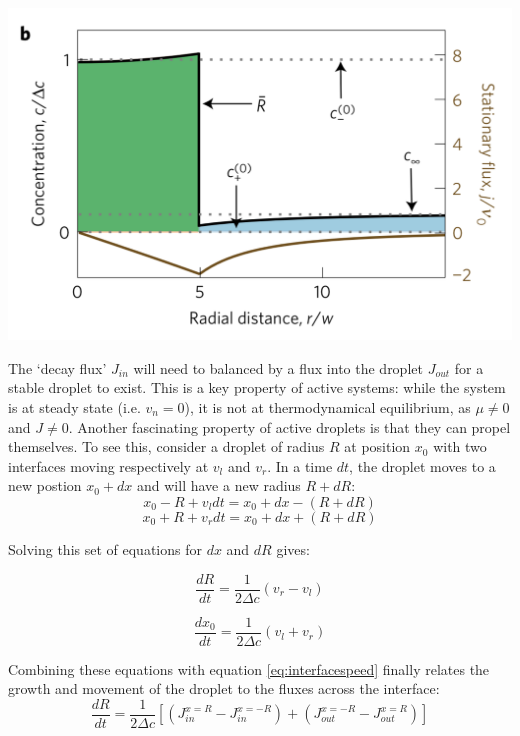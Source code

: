 \documentclass{Dissertate}
\let\origfigure\figure
\let\endorigfigure\endfigure
\renewenvironment{figure}[1][2] {
    \expandafter\origfigure\expandafter[H]
} {
    \endorigfigure
}
\begin{document}
\begin{figure}
\hypertarget{fig:activedroplet}{%
\centering
\includegraphics{source/figures/png/activedroplet.png}
\caption{Typical concentration profile of active droplet. Taken from
21}\label{fig:activedroplet}
}
\end{figure}

The `decay flux' \(J_{in}\) will need to balanced by a flux into the
droplet \(J_{out}\) for a stable droplet to exist. This is a key
property of active systems: while the system is at steady state (i.e.
\(v_n=0\)), it is not at thermodynamical equilibrium, as \(\mu \neq 0\)
and \(J\neq0\). Another fascinating property of active droplets is that
they can propel themselves. To see this, consider a droplet of radius
\(R\) at position \(x_0\) with two interfaces moving respectively at
\(v_l\) and \(v_r\). In a time \(dt\), the droplet moves to a new
postion \(x_0+dx\) and will have a new radius \(R+dR\): \[
x_0-R+v_ldt=x_0+dx-(R+dR)
\] \[
x_0+R+v_rdt=x_0+dx+(R+dR)
\]

Solving this set of equations for \(dx\) and \(dR\) gives:

\begin{equation}
\frac{dR}{dt}=\frac{1}{2\Delta c}(v_r-v_l)
\label{eq:radius}\end{equation}

\begin{equation}
\frac{dx_0}{dt}=\frac{1}{2\Delta c}(v_l+v_r)
\label{eq:position}\end{equation}

Combining these equations with equation \ref{eq:interfacespeed}
finally relates the growth and movement of the droplet to the fluxes
across the interface: \[
\frac{dR}{dt}=\frac{1}{2\Delta c}\left[(J_{in}^{x=R}-J_{in}^{x=-R})+(J_{out}^{x=-R}-J_{out}^{x=R})\right]
\]
\end{document}
